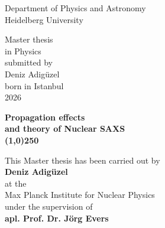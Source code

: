 
\thispagestyle{empty}
  
\begin{center}
  \renewcommand{\baselinestretch}{2.00}
  \Large\sffamily
  Department of Physics and Astronomy\\
  \large Heidelberg University
  \par\vfill%
  Master thesis\\
  in Physics\\
  submitted by\\
  Deniz Adigüzel\\
  born in Istanbul\\
  2026
\end{center}

\newpage
\phantom{thesis}
\thispagestyle{empty}
\cleardoublepage

\thispagestyle{empty}
{%
  
\begin{center}

  \renewcommand{\baselinestretch}{2.00}
    \Large\bfseries%
    Propagation effects \\ and theory of Nuclear SAXS
  \\[-1em]
  \line(1,0){250}
  \\
  \normalfont\Large\sffamily
    \large\normalfont 
    
 \begin{minipage}{1.1\textwidth}
    \end{minipage}
    
  
  \par
  
  \vfill
  \large\normalfont
  This Master thesis has been carried out by \\ \textbf{Deniz Adigüzel}\\
  at the\\
  Max Planck Institute for Nuclear Physics\\
  under the supervision of\\
  \textbf{apl. Prof. Dr. J\"org Evers}
  
\end{center}\par

\renewcommand{\baselinestretch}{1.00}\normalsize
}

